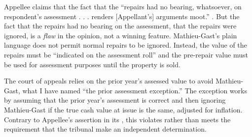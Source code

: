 \documentclass[12pt,\documentclassflag]{michiganCourtOfAppealsBrief}
\begin{document}
Appellee claims that the fact that the ``repairs had no bearing, whatsoever, on respondent's assessment . . .  renders [Appellant's] arguments moot.'' .
But the fact that the repairs had no bearing on the assessment, that the repairs were ignored, is a \emph{flaw} in the opinion, not a winning feature. 
Mathieu-Gast's plain language does not permit normal repairs to be ignored. Instead, the value of the repairs must be ``indicated on the assessment roll'' and the pre-repair value must be used for assessment purposes until the property is sold.

The court of appeals relies on the prior year's assessed value to avoid Mathieu-Gast, what I have named ``the prior assessment exception.'' The exception works by assuming that the prior year's assessment is correct and then ignoring Mathieu-Gast if the true cash value at issue is the same, adjusted for inflation. %
Contrary to Appellee's assertion in its , this violates rather than meets the requirement that the tribunal make an independent determination.
\end{document}

